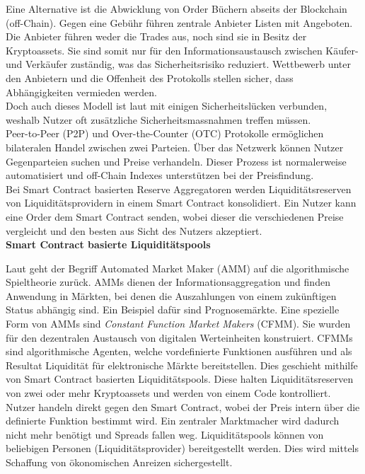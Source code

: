 \documentclass[12pt,a4paper,titlepage,oneside,english]{article}
\begin{document}
Eine Alternative ist die Abwicklung von Order Büchern abseits der Blockchain (off-Chain). %
Gegen eine Gebühr führen zentrale Anbieter Listen mit Angeboten. Die Anbieter führen weder die Trades aus, noch sind sie in Besitz der Kryptoassets. Sie sind somit nur für den Informationsaustausch zwischen Käufer- und Verkäufer zuständig, was das Sicherheitsrisiko reduziert.  Wettbewerb unter den Anbietern und die Offenheit des Protokolls stellen sicher, dass Abhängigkeiten vermieden werden. \citep[vgl.][S.8]{Schaer2020} \\ Doch auch dieses Modell ist laut \citet[S.2]{Angeris2019} mit einigen Sicherheitslücken verbunden, weshalb Nutzer oft zusätzliche Sicherheitsmassnahmen treffen müssen. \\
Peer-to-Peer (P2P) und Over-the-Counter (OTC) Protokolle ermöglichen bilateralen Handel zwischen zwei Parteien. Über das Netzwerk können Nutzer Gegenparteien suchen und Preise verhandeln. Dieser Prozess ist normalerweise automatisiert und off-Chain Indexes unterstützen bei der Preisfindung. \citep[vgl.][S.11]{Schaer2020} \\
Bei Smart Contract basierten Reserve Aggregatoren werden Liquiditätsreserven von Liquiditätsprovidern in einem Smart Contract konsolidiert. Ein Nutzer kann eine Order dem Smart Contract senden, wobei dieser die verschiedenen Preise vergleicht und den besten aus Sicht des Nutzers akzeptiert. \citep[vgl.][S.10f.]{Schaer2020}\\ %

\textbf{Smart Contract basierte Liquiditätspools}

Laut \cite{Berenzon2020} geht der Begriff Automated Market Maker (AMM) auf die algorithmische Spieltheorie zurück. AMMs dienen der Informationsaggregation und finden Anwendung in Märkten, bei denen die Auszahlungen von einem zukünftigen Status abhängig sind. Ein Beispiel dafür sind Prognosemärkte.
Eine spezielle Form von AMMs sind \textit{Constant Function Market Makers} (CFMM). Sie wurden für den dezentralen Austausch von digitalen Werteinheiten konstruiert. CFMMs sind algorithmische Agenten, welche vordefinierte Funktionen ausführen und als Resultat Liquidität für elektronische Märkte bereitstellen. Dies geschieht mithilfe von Smart Contract basierten Liquiditätspools. Diese halten Liquiditätsreserven von zwei oder mehr Kryptoassets und werden von einem Code kontrolliert. Nutzer handeln direkt gegen den Smart Contract, wobei der Preis intern über die definierte Funktion bestimmt wird. Ein zentraler Marktmacher wird dadurch nicht mehr benötigt und Spreads fallen weg. 
Liquiditätspools können von beliebigen Personen (Liquiditätsprovider) bereitgestellt werden. Dies wird mittels Schaffung von ökonomischen Anreizen sichergestellt. \citep[vgl.][]{Berenzon2020}
\end{document}
